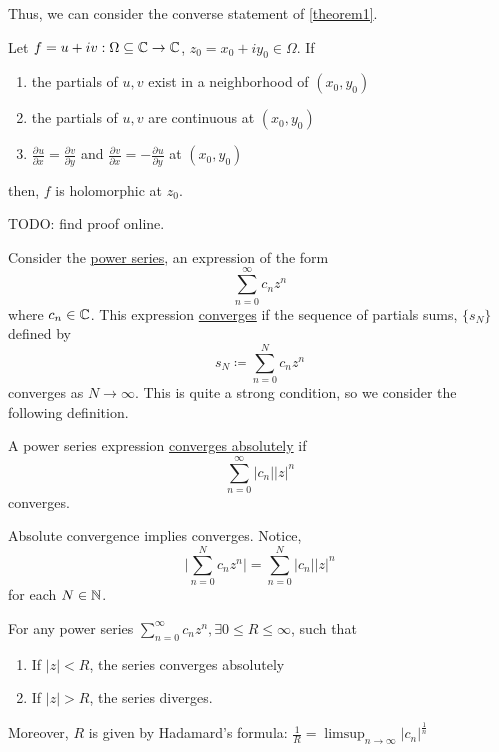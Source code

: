\documentclass[11pt]{article}
\newcommand*{\pd}[3][]{\ensuremath{\frac{\partial^{#1} #2}{\partial #3^{#1}}}}
\begin{document}
Thus, we can consider the converse statement of \cref{theorem1}.
\begin{theorem}
Let $f=u+iv : \Omega \subseteq \mathbb{C} \to \mathbb{C}$, $z_0 = x_0 + iy_0 \in \Omega$. If
\begin{enumerate}
\item the partials of $u,v$ exist in a neighborhood of $(x_0,y_0)$
\item the partials of $u,v$ are continuous at $(x_0,y_0)$
\item $\pd{u}{x} = \pd{v}{y}$ and $\pd{v}{x} = - \pd{u}{y}$ at $(x_0,y_0)$
\end{enumerate}
then, $f$ is holomorphic at $z_0$.
\label{theorem2}
\end{theorem}
TODO: find proof online.

\begin{example}
Consider the \underline{power series}, an expression of the form
\begin{equation*}
\sum^\infty_{n=0} c_nz^n
\end{equation*}
where $c_n \in \mathbb{C}$. This expression \underline{converges} if the sequence of
partials sums, $\{s_N\}$ defined by
\begin{equation*}
s_N \coloneqq \sum^N_{n=0} c_nz^n 
\end{equation*}
converges as $N \to \infty$. This is quite a strong condition, so we consider
the following definition.
\end{example}
\begin{definition}
A power series expression \underline{converges absolutely} if
\begin{equation*}
\sum^{\infty}_{n=0} |c_n||z|^n
\end{equation*}
converges.
\end{definition}
\begin{remark}
Absolute convergence implies converges. Notice,
\begin{equation*}
\bigg| \sum_{n=0}^N c_n z^n \bigg| = \sum^N_{n=0} |c_n||z|^n
\end{equation*}
for each $N \in \mathbb{N}$.
\end{remark}
\begin{theorem}
For any power series $\displaystyle\sum^\infty_{n=0} c_nz^n, \exists 0 \leq R \leq
\infty$, such that
\begin{enumerate}
\item If $|z| < R$, the series converges absolutely
\item If $|z| > R$, the series diverges.
\end{enumerate}
Moreover, $R$ is given by Hadamard's formula: $\displaystyle\frac{1}{R} = \limsup_{n \to
\infty} |c_n|^\frac{1}{n}$
\label{theorem3}
\end{theorem}
\end{document}
